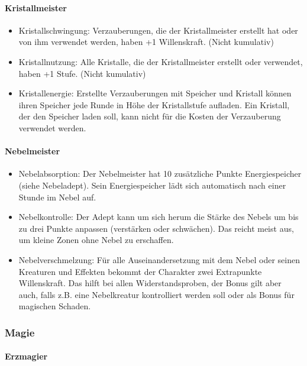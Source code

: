 \documentclass{article}
\begin{document}
\paragraph{Kristallmeister}

\begin{itemize}
\item Kristallschwingung: Verzauberungen, die der Kristallmeister erstellt hat oder von ihm verwendet werden, haben +1 Willenskraft. (Nicht kumulativ)
\item Kristallnutzung: Alle Kristalle, die der Kristallmeister erstellt oder verwendet, haben +1 Stufe. (Nicht kumulativ)
\item Kristallenergie: Erstellte Verzauberungen mit Speicher und Kristall können ihren Speicher jede Runde in Höhe der Kristallstufe aufladen. Ein Kristall, der den Speicher laden soll, kann nicht für die Kosten der Verzauberung verwendet werden.
\end{itemize}

\paragraph{Nebelmeister}

\begin{itemize}
\item Nebelabsorption: Der Nebelmeister hat 10 zusätzliche Punkte Energiespeicher (siehe Nebeladept). Sein Energiespeicher lädt sich automatisch nach einer Stunde im Nebel auf.
\item Nebelkontrolle: Der Adept kann um sich herum die Stärke des Nebels um bis zu drei Punkte anpassen (verstärken oder schwächen). Das reicht meist aus, um kleine Zonen ohne Nebel zu erschaffen.
\item Nebelverschmelzung: Für alle Auseinandersetzung mit dem Nebel oder seinen Kreaturen und Effekten bekommt der Charakter zwei Extrapunkte Willenskraft. Das hilft bei allen Widerstandsproben, der Bonus gilt aber auch, falls z.B. eine Nebelkreatur kontrolliert werden soll oder als Bonus für magischen Schaden.
\end{itemize}

\subsubsection{Magie}

\paragraph{Erzmagier }
\end{document}
